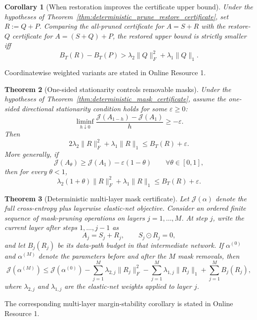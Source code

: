 \documentclass[11pt]{article}
\theoremstyle{plain}
\newtheorem{thm}{Theorem}[section]
\newtheorem{cor}[thm]{Corollary}
\theoremstyle{definition}
\theoremstyle{remark}
\newcommand{\1}{\mathbf{1}}
\begin{document}
\begin{cor}[When restoration improves the certificate upper bound]
\label{cor:restoration_improves_certificate}
Under the hypotheses of Theorem~\ref{thm:deterministic_prune_restore_certificate}, set \(R:=Q+P\). Comparing the all-pruned certificate for \(A=S+R\) with the restore-\(Q\) certificate for \(A=(S+Q)+P\), the restored upper bound is strictly smaller iff
\[
B_T(R)-B_T(P)
>
\lambda_2\|Q\|_F^2+\lambda_1\|Q\|_1.
\]
\end{cor}

Coordinatewise weighted variants are stated in Online Resource 1.

\begin{thm}[One-sided stationarity controls removable masks]
\label{thm:deterministic_mask_stationarity}
Under the hypotheses of Theorem~\ref{thm:deterministic_mask_certificate}, assume the one-sided directional stationarity condition holds for some \(\varepsilon\ge0\):
\[
\liminf_{h\downarrow0}
\frac{\mathcal J(A_{1-h})-\mathcal J(A_1)}{h}
\ge
-\varepsilon.
\]
Then
\[
2\lambda_2\|R\|_F^2+\lambda_1\|R\|_1
\le
B_T(R)+\varepsilon.
\]
More generally, if
\[
\mathcal J(A_\theta)\ge \mathcal J(A_1)-\varepsilon(1-\theta)
\qquad\forall\theta\in[0,1],
\]
then for every \(\theta<1\),
\[
\lambda_2(1+\theta)\|R\|_F^2+\lambda_1\|R\|_1
\le
B_T(R)+\varepsilon.
\]
\end{thm}

\begin{thm}[Deterministic multi-layer mask certificate]
\label{thm:deterministic_multilayer_mask_certificate}
Let \(\mathcal J(\alpha)\) denote the full cross-entropy plus layerwise elastic-net objective. Consider an ordered finite sequence of mask-pruning operations on layers \(j=1,\dots,M\). At step \(j\), write the current layer after steps \(1,\dots,j-1\) as
\[
A_j=S_j+R_j,
\qquad
S_j\odot R_j=0,
\]
and let \(B_j(R_j)\) be its data-path budget in that intermediate network. If \(\alpha^{(0)}\) and \(\alpha^{(M)}\) denote the parameters before and after the \(M\) mask removals, then
\[
\mathcal J(\alpha^{(M)})
\le
\mathcal J(\alpha^{(0)})
-
\sum_{j=1}^M\lambda_{2,j}\|R_j\|_F^2
-
\sum_{j=1}^M\lambda_{1,j}\|R_j\|_1
+
\sum_{j=1}^M B_j(R_j),
\]
where \(\lambda_{2,j}\) and \(\lambda_{1,j}\) are the elastic-net weights applied to layer \(j\).
\end{thm}

The corresponding multi-layer margin-stability corollary is stated in Online Resource 1.
\end{document}
